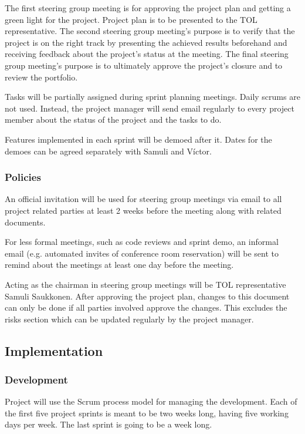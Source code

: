 \documentclass[12pt,titlepage]{article}
\begin{document}
		The first steering group meeting is for approving the project plan and getting a green light for the project.
		Project plan is to be presented to the TOL representative.
		The second steering group meeting's purpose is to verify that the project is on the right track by presenting the achieved results beforehand and receiving feedback about the project's status at the meeting.
		The final steering group meeting's purpose is to ultimately approve the project's closure and to review the portfolio.
 
		Tasks will be partially assigned during sprint planning meetings.
		Daily scrums are not used.
		Instead, the project manager will send email regularly to every project member about the status of the project and the tasks to do.
		
		Features implemented in each sprint will be demoed after it.
		Dates for the demoes can be agreed separately with Samuli and Víctor.
 
		\subsubsection{Policies}
 
			An official invitation will be used for steering group meetings via email to all project related parties at least 2 weeks before the meeting along with related documents.
 
			For less formal meetings, such as code reviews and sprint demo, an informal email (e.g. automated invites of conference room reservation) will be sent to remind about the meetings at least one day before the meeting.

			Acting as the chairman in steering group meetings will be TOL representative Samuli Saukkonen.
			After approving the project plan, changes to this document can only be done if all parties involved approve the changes.
			This excludes the risks section which can be updated regularly by the project manager.
 
		\subsection{Implementation}
 
			\subsubsection{Development}
 
				Project will use the Scrum process model for managing the development.
				Each of the first five project sprints is meant to be two weeks long, having five working days per week.
				The last sprint is going to be a week long.
 
\end{document}
